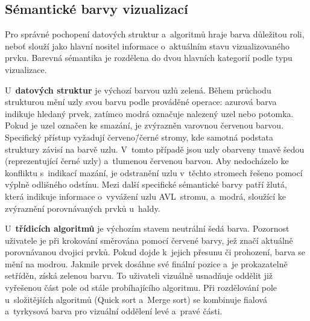 \subsection{Sémantické barvy vizualizací}
\label{subsec:semantic-colors}

Pro správné pochopení datových struktur a~algoritmů hraje barva důležitou roli, neboť slouží jako hlavní nositel informace o~aktuálním stavu vizualizovaného prvku.
Barevná sémantika je rozdělena do dvou hlavních kategorií podle typu vizualizace.

U~\textbf{datových struktur} je výchozí barvou uzlů zelená.
Během průchodu strukturou mění uzly svou barvu podle prováděné operace: azurová barva indikuje hledaný prvek, zatímco modrá označuje nalezený uzel nebo potomka.
Pokud je uzel označen ke smazání, je zvýrazněn varovnou červenou barvou.
Specifický přístup vyžadují červeno\=/černé stromy, kde samotná podstata struktury závisí na barvě uzlu.
V~tomto případě jsou uzly obarveny tmavě šedou (reprezentující černé uzly) a~tlumenou červenou barvou.
Aby nedocházelo ke konfliktu s~indikací mazání, je odstranění uzlu v~těchto stromech řešeno pomocí výplně odlišného odstínu.
Mezi další specifické sémantické barvy patří žlutá, která indikuje informace o~vyvážení uzlu AVL~stromu, a~modrá, sloužící ke zvýraznění porovnávaných prvků u~haldy.

U~\textbf{třídicích algoritmů} je výchozím stavem neutrální šedá barva.
Pozornost uživatele je při krokování směrována pomocí červené barvy, jež značí aktuálně porovnávanou dvojici prvků.
Pokud dojde k~jejich přesunu či prohození, barva se mění na modrou.
Jakmile prvek dosáhne své finální pozice a~je prokazatelně setříděn, získá zelenou barvu.
To uživateli vizuálně usnadňuje oddělit již vyřešenou část pole od stále probíhajícího algoritmu.
Při rozdělování pole u~složitějších algoritmů (Quick sort a~Merge sort) se kombinuje fialová a~tyrkysová barva pro vizuální oddělení levé a~pravé části.



